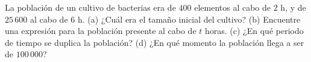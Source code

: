\item La población de un cultivo de bacterias era de $400$ elementos al cabo de $2 \text{ h}$, y de $25\,600$ al cabo de $6 \text{ h}$. (a) ¿Cuál era el tamaño inicial del cultivo? (b) Encuentre una expresión para la población presente al cabo de $t$ horas. (c) ¿En qué periodo de tiempo se duplica la población? (d) ¿En qué momento la población llega a ser de $100\,000$?
